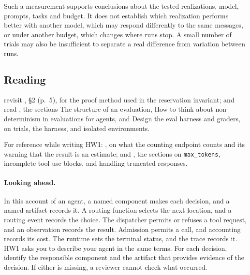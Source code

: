 Such a measurement supports conclusions about the tested realizations, model, prompts, tasks and
budget. It does not establish which realization performs better with another model, which may
respond differently to the same messages, or under another budget, which changes where runs stop.
A small number of trials may also be insufficient to separate a real difference from variation
between runs.

\subsection{Reading}

revisit \citet{mit6042-lec16}, \S2 (p.~5), for the proof method used in the reservation
invariant; and read \citet{anthropic-evals-agents}, the sections The structure of an
evaluation, How to think about non-determinism in evaluations for agents, and Design the eval
harness and graders, on trials, the harness, and isolated environments.

For reference while writing HW1: \citet{anthropic-token-counting}, on what the counting endpoint
counts and its warning that the result is an estimate; and \citet{anthropic-stop-reasons}, the
sections on \texttt{max\_tokens}, incomplete tool use blocks, and handling truncated responses.

\paragraph{Looking ahead.} In this account of an agent, a named component makes each decision,
and a named artifact records it. A routing function selects the next location, and a routing event
records the choice. The dispatcher permits or refuses a tool request, and an observation records
the result. Admission permits a call, and accounting records its cost. The runtime sets the
terminal status, and the trace records it. HW1 asks you to describe your agent in the same terms.
For each decision, identify the responsible component and the artifact that provides evidence of
the decision. If either is missing, a reviewer cannot check what occurred.
